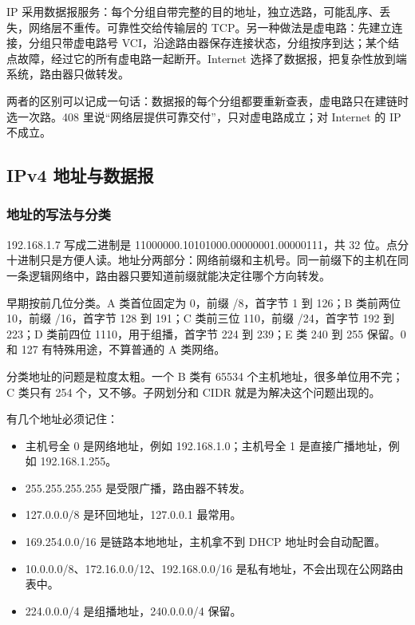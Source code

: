 IP 采用数据报服务：每个分组自带完整的目的地址，独立选路，可能乱序、丢失，网络层不重传。可靠性交给传输层的 TCP。另一种做法是虚电路：先建立连接，分组只带虚电路号 VCI，沿途路由器保存连接状态，分组按序到达；某个结点故障，经过它的所有虚电路一起断开。Internet 选择了数据报，把复杂性放到端系统，路由器只做转发。

两者的区别可以记成一句话：数据报的每个分组都要重新查表，虚电路只在建链时选一次路。408 里说“网络层提供可靠交付”，只对虚电路成立；对 Internet 的 IP 不成立。

\subsection{IPv4 地址与数据报}

\subsubsection{地址的写法与分类}

192.168.1.7 写成二进制是 11000000.10101000.00000001.00000111，共 32 位。点分十进制只是方便人读。地址分两部分：网络前缀和主机号。同一前缀下的主机在同一条逻辑网络中，路由器只要知道前缀就能决定往哪个方向转发。

早期按前几位分类。A 类首位固定为 0，前缀 /8，首字节 1 到 126；B 类前两位 10，前缀 /16，首字节 128 到 191；C 类前三位 110，前缀 /24，首字节 192 到 223；D 类前四位 1110，用于组播，首字节 224 到 239；E 类 240 到 255 保留。0 和 127 有特殊用途，不算普通的 A 类网络。

分类地址的问题是粒度太粗。一个 B 类有 65534 个主机地址，很多单位用不完；C 类只有 254 个，又不够。子网划分和 CIDR 就是为解决这个问题出现的。

有几个地址必须记住：

\begin{itemize}
  \item 主机号全 0 是网络地址，例如 192.168.1.0；主机号全 1 是直接广播地址，例如 192.168.1.255。
  \item 255.255.255.255 是受限广播，路由器不转发。
  \item 127.0.0.0/8 是环回地址，127.0.0.1 最常用。
  \item 169.254.0.0/16 是链路本地地址，主机拿不到 DHCP 地址时会自动配置。
  \item 10.0.0.0/8、172.16.0.0/12、192.168.0.0/16 是私有地址，不会出现在公网路由表中。
  \item 224.0.0.0/4 是组播地址，240.0.0.0/4 保留。
\end{itemize}

